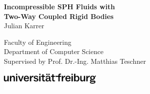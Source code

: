 \documentclass[oneside, a4paper]{book}
\begin{document}
\begin{titlepage}
  \pagestyle{empty}
  \begingroup
  \vspace*{6cm}
  \begin{FlushLeft}
    \vspace{0.5cm}
    \noindent %
    \Huge\textbf{Incompressible SPH Fluids with\\Two-Way Coupled Rigid Bodies}\\
    \vspace{0.5cm}
    \noindent %
    \Large{Julian Karrer}
  \end{FlushLeft}
  \vfill
  \begin{center}
    \large
    Faculty of Engineering\\
    Department of Computer Science\\
    Supervised by Prof. Dr.-Ing. Matthias Teschner\\
    \vspace{0.1cm}
    \includegraphics*[width=5cm]{images/ufr-logo.png}
  \end{center}
  \endgroup
\end{titlepage}
\newpage{}
\ClearShipoutPicture
\end{document}
